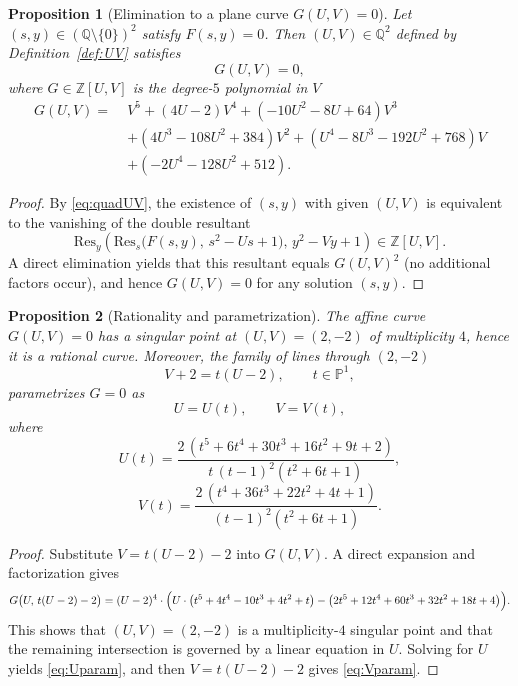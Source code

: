 \documentclass[12pt]{article}
\newtheorem{proposition}{Proposition}
\theoremstyle{remark}
\theoremstyle{definition}
\begin{document}
\begin{proposition}[Elimination to a plane curve $G(U,V)=0$]\label{prop:G}
Let $(s,y)\in(\mathbb{Q}\setminus\{0\})^2$ satisfy $F(s,y)=0$.
Then $(U,V)\in\mathbb{Q}^2$ defined by Definition~\ref{def:UV} satisfies
\begin{equation}\label{eq:G}
G(U,V)=0,
\end{equation}
where $G\in\mathbb{Z}[U,V]$ is the degree-$5$ polynomial in $V$
\begin{equation}\label{eq:Gpoly}
\begin{aligned}
G(U,V)=\;&V^{5}+(4U-2)V^{4}+(-10U^{2}-8U+64)V^{3}\\
&+(4U^{3}-108U^{2}+384)V^{2}+(U^{4}-8U^{3}-192U^{2}+768)V\\
&+(-2U^{4}-128U^{2}+512).
\end{aligned}
\end{equation}
\end{proposition}

\begin{proof}
By \eqref{eq:quadUV}, the existence of $(s,y)$ with given $(U,V)$ is equivalent to the vanishing of the double resultant
\[
\mathrm{Res}_{y}\!\left(\mathrm{Res}_{s}\bigl(F(s,y),\,s^{2}-Us+1\bigr),\,y^{2}-Vy+1\right)\in\mathbb{Z}[U,V].
\]
A direct elimination yields that this resultant equals $G(U,V)^2$ (no additional factors occur), and hence $G(U,V)=0$ for any solution $(s,y)$.
\end{proof}

\begin{proposition}[Rationality and parametrization]\label{prop:param}
The affine curve $G(U,V)=0$ has a singular point at $(U,V)=(2,-2)$ of multiplicity $4$, hence it is a rational curve.
Moreover, the family of lines through $(2,-2)$
\[
V+2=t(U-2),\qquad t\in\mathbb{P}^{1},
\]
parametrizes $G=0$ as
\begin{equation}\label{eq:UVparam}
U=U(t),\qquad V=V(t),
\end{equation}
where
\begin{equation}\label{eq:Uparam}
U(t)=\frac{2\,(t^{5}+6t^{4}+30t^{3}+16t^{2}+9t+2)}{t\,(t-1)^{2}(t^{2}+6t+1)},
\end{equation}
\begin{equation}\label{eq:Vparam}
V(t)=\frac{2\,(t^{4}+36t^{3}+22t^{2}+4t+1)}{(t-1)^{2}(t^{2}+6t+1)}.
\end{equation}
\end{proposition}

\begin{proof}
Substitute $V=t(U-2)-2$ into $G(U,V)$.
A direct expansion and factorization gives
\[
G\bigl(U,\,t(U-2)-2\bigr)=(U-2)^{4}\cdot\Bigl(U\cdot\bigl(t^{5}+4t^{4}-10t^{3}+4t^{2}+t\bigr)-\bigl(2t^{5}+12t^{4}+60t^{3}+32t^{2}+18t+4\bigr)\Bigr).
\]
This shows that $(U,V)=(2,-2)$ is a multiplicity-$4$ singular point and that the remaining intersection is governed by a linear equation in $U$.
Solving for $U$ yields \eqref{eq:Uparam}, and then $V=t(U-2)-2$ gives \eqref{eq:Vparam}.
\end{proof}
\end{document}
